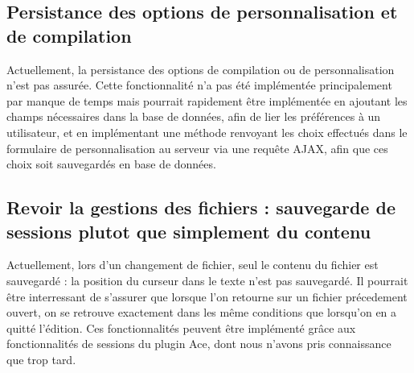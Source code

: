 \subsection{Persistance des options de personnalisation et de compilation}

Actuellement, la persistance des options de compilation ou de personnalisation n'est pas assurée. Cette fonctionnalité n'a pas été implémentée principalement par manque de temps mais pourrait rapidement être implémentée en ajoutant les champs nécessaires dans la base de données, afin de lier les préférences à un utilisateur, et en implémentant une méthode renvoyant les choix effectués dans le formulaire de personnalisation au serveur via une requête AJAX, afin que ces choix soit sauvegardés en base de données.

\subsection{Revoir la gestions des fichiers : sauvegarde de sessions plutot que simplement du contenu}
Actuellement, lors d'un changement de fichier, seul le contenu du fichier est sauvegardé : la position du curseur dans le texte n'est pas sauvegardé. Il pourrait être interressant de s'assurer que lorsque l'on retourne sur un fichier précedement ouvert, on se retrouve exactement dans les même conditions que lorsqu'on en a quitté l'édition. Ces fonctionnalités peuvent être implémenté grâce aux fonctionnalités  de sessions du plugin Ace, dont nous n'avons pris connaissance que trop tard.
